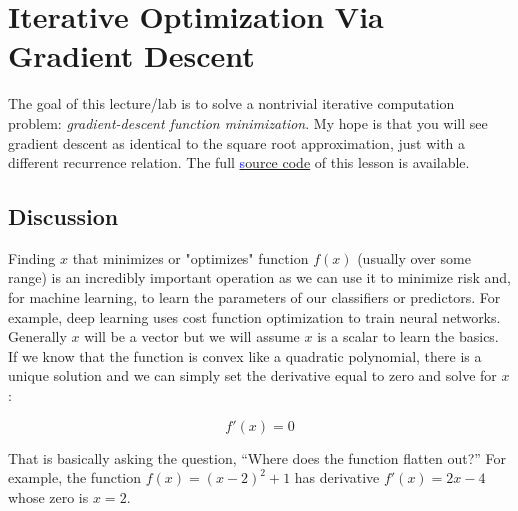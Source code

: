 \documentclass[titlepage]{tufte-book}
\newcounter{problem}
\begin{document}
\chapter{Iterative Optimization Via Gradient Descent}

\begin{fullwidth}

The goal of this lecture/lab is to solve a nontrivial iterative computation problem: {\em gradient-descent function minimization}. My hope is that you will see gradient descent as identical to the square root approximation, just with a different recurrence relation. The full \href{https://github.com/parrt/msan501/blob/master/notes/code/descent.py}{\textcolor{blue}source code} of this lesson is available.

\section{Discussion}

Finding $x$ that minimizes or "optimizes" function $f(x)$ (usually over some range) is an incredibly important operation as we can use it to minimize risk and, for machine learning, to learn the parameters of our classifiers or predictors. For example, deep learning uses cost function optimization to train neural networks. Generally $x$ will be a vector but we will assume $x$ is a scalar to learn the basics. If we know that the function is convex like a quadratic polynomial, there is a unique solution and we can simply set the derivative equal to zero and solve for $x$:

\[\tag{Analytic solution to optimization}
f'(x) = 0
\]

\noindent That is basically asking the question, ``Where does the function flatten out?''  For example, the function $f(x) = (x-2)^2 + 1$ has derivative $f'(x) = 2x - 4$ whose zero is $x=2$.

\begin{center}
\end{center}


\end{fullwidth}
\end{document}
